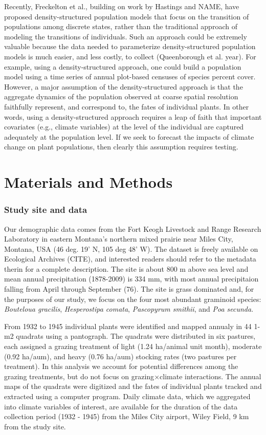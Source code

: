 \documentclass[author-year, 12pt,review]{components/elsarticle} %
\begin{document}
Recently, Freckelton et al., building on work by Hastings and NAME, have
proposed density-structured population models that focus on the
transition of populations among discrete states, rather than the
traditional approach of modeling the transitions of individuals. Such an
approach could be extremely valuable because the data needed to
parameterize density-structured population models is much easier, and
less costly, to collect (Queenborough et al. year). For example, using a
density-structured approach, one could build a population model using a
time series of annual plot-based censuses of species percent cover.
However, a major assumption of the density-structured approach is that
the aggregate dynamics of the population observed at coarse spatial
resolution faithfully represent, and correspond to, the fates of
individual plants. In other words, using a density-structured approach
requires a leap of faith that important covariates (e.g., climate
variables) at the level of the individual are captured adequately at the
population level. If we seek to forecast the impacts of climate change
on plant populations, then clearly this assumption requires testing.

\section{Materials and Methods}\label{materials-and-methods}

\subsubsection{Study site and data}\label{study-site-and-data}

Our demographic data comes from the Fort Keogh Livestock and Range
Research Laboratory in eastern Montana's northern mixed prairie near
Miles City, Montana, USA (46 deg. 19' N, 105 deg 48' W). The dataset is
freely available on Ecological Archives (CITE), and interested readers
should refer to the metadata therin for a complete description. The site
is about 800 m above sea level and mean annual precipitation (1878-2009)
is 334 mm, with most annual precipitaion falling from April through
September (76). The site is grass dominated and, for the purposes of our
study, we focus on the four most abundant graminoid species:
\emph{Bouteloua gracilis}, \emph{Hesperostipa comata},
\emph{Pascopyrum smithii}, and \emph{Poa secunda}.

From 1932 to 1945 individual plants were identified and mapped annualy
in 44 1-m2 quadrats using a pantograph. The quadrats were distributed in
six pastures, each assigned a grazing treatment of light (1.24 ha/animal
unit month), moderate (0.92 ha/aum), and heavy (0.76 ha/aum) stocking
rates (two pastures per treatment). In this analysis we account for
potential differences among the grazing treatments, but do not focus on
grazing$\times$climate interactions. The annual maps of the quadrats
were digitized and the fates of individual plants tracked and extracted
using a computer program. Daily climate data, which we aggregated into
climate variables of interest, are available for the duration of the
data collection period (1932 - 1945) from the Miles City airport, Wiley
Field, 9 km from the study site.
\end{document}
